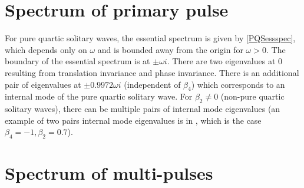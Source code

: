 \documentclass[12pt]{article}
\begin{document}
\section{Spectrum of primary pulse}

For pure quartic solitary waves, the essential spectrum is given by \cref{PQSessspec}, which depends only on $\omega$ and is bounded away from the origin for $\omega > 0$. The boundary of the essential spectrum is at $\pm \omega i$. There are two eigenvalues at 0 resulting from translation invariance and phase invariance. There is an additional pair of eigenvalues at $\pm 0.9972 \omega i$ \cite{Tam2019} (independent of $\beta_4$) which corresponds to an internal mode of the pure quartic solitary wave. For $\beta_2 \neq 0$ (non-pure quartic solitary waves), there can be multiple pairs of internal mode eigenvalues (an example of two pairs internal mode eigenvalues is in \cite[Figure 9]{Tam2020}, which is the case $\beta_4 = -1, \beta_2 = 0.7$).

\section{Spectrum of multi-pulses}
\end{document}
